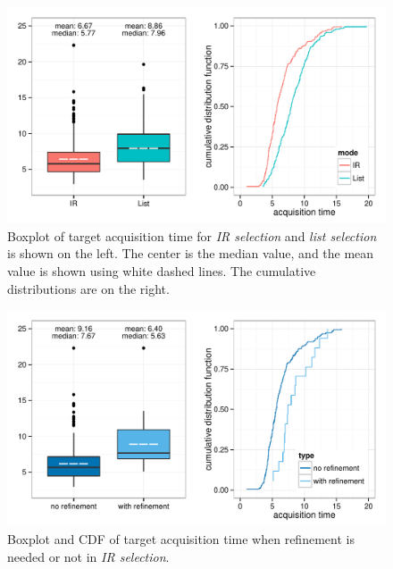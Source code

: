 \begin{figure}[t]
\centering
\includegraphics[width=0.95\columnwidth]{figures/result_study1a.pdf}
\caption{Boxplot of target acquisition time for {\em IR selection} and {\em list selection} is shown on the left. The center is the median value, and the mean value is shown using white dashed lines. The cumulative distributions are on the right.}
\label{fig:ir_vs_list}
\end{figure}

\begin{figure}[t]
\centering
\includegraphics[width=0.95\columnwidth]{figures/result_study1b.pdf}
\caption{Boxplot and CDF of target acquisition time when refinement is needed or not in {\em IR selection}.}
\label{fig:with_without_refinement}
\end{figure}

